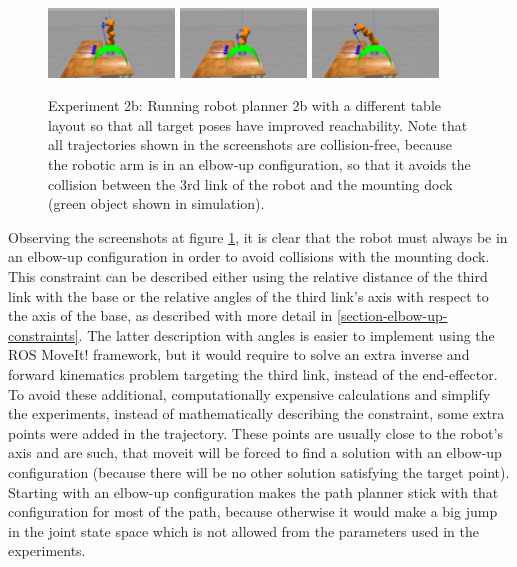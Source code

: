 \begin{center}
\begin{figure}[H]
\includegraphics[width=0.3\textwidth]{images/robot_planner2b/robot_planner2b_7}
\includegraphics[width=0.3\textwidth]{images/robot_planner2b/robot_planner2b_8}
\includegraphics[width=0.3\textwidth]{images/robot_planner2b/robot_planner2b_9}\\
\caption{Experiment 2b: Running robot planner 2b with a different table layout so that all target poses have improved reachability. Note that all trajectories shown in the screenshots are collision-free, 
because the robotic arm is in an elbow-up configuration, so that it avoids the collision between the 3rd link of the robot and the mounting dock (green object shown in simulation).}
\label{experiment-robot-planner2b}
\end{figure}
\end{center}

Observing the screenshots at figure \ref{experiment-robot-planner2b}, it is clear that the robot must always be in an elbow-up configuration in order to avoid collisions with the mounting dock. This constraint can be 
described either using the relative distance of the third link with the base or the relative angles of the third link's axis with respect to the axis of the base, as described with more detail in 
\ref{section-elbow-up-constraints}. The latter description with angles is easier to implement using the ROS MoveIt! framework,  but it would require to solve an extra inverse and forward kinematics problem targeting the third 
link, instead of the end-effector. To avoid these additional, computationally expensive calculations and simplify the experiments, instead of mathematically describing the constraint, 
some extra points were added in the trajectory. 
These points are usually close to the robot's axis and are such, that 
moveit will be forced to find a solution with an elbow-up configuration (because there will be no other solution satisfying the target point). Starting with an elbow-up configuration makes the path planner stick with that 
configuration for most of the path, because otherwise it would make a big jump in the joint state space which is not allowed from the parameters used in the experiments.

